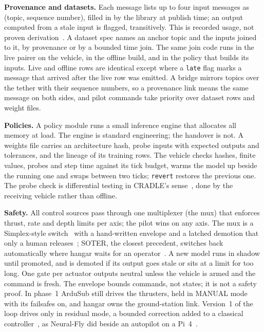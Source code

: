 \documentclass[conference]{IEEEtran}
\begin{document}
\textbf{Provenance and datasets.} Each message lists up to four input
messages as (topic, sequence number), filled in by the library at publish
time; an output computed from a stale input is flagged, transitively. This is
recorded usage, not proven derivation~\cite{provdm2013}. A dataset spec names
an anchor topic and the inputs joined to it, by provenance or by a bounded
time join. The same join code runs in the live pairer on the vehicle, in the
offline build, and in the policy that builds its inputs. Live and offline
rows are identical except where a \texttt{late} flag marks a message that
arrived after the live row was emitted. A bridge mirrors topics over the
tether with their sequence numbers, so a provenance link means the same
message on both sides, and pilot commands take priority over dataset rows and
weight files.

\textbf{Policies.} A policy module runs a small inference engine that
allocates all memory at load. The engine is standard engineering; the
handover is not. A weights file carries an architecture hash, probe inputs
with expected outputs and tolerances, and the lineage of its training rows.
The vehicle checks hashes, finite values, probes and step time against its
tick budget, warms the model up beside the running one and swaps between two
ticks; \texttt{revert} restores the previous one. The probe check is
differential testing in CRADLE's sense~\cite{pham2019cradle}, done by the
receiving vehicle rather than offline.

\textbf{Safety.} All control sources pass through one multiplexer (the mux)
that enforces thrust, rate and depth limits per axis; the pilot wins on any
axis. The mux is a Simplex-style switch~\cite{seto1998simplex} with a
hand-written envelope and a latched demotion that only a human
releases~\cite{hobbs2023rta}; SOTER, the closest precedent, switches back
automatically where hangar waits for an operator~\cite{desai2019soter}. A new
model runs in shadow until promoted, and is demoted if its output goes stale
or sits at a limit for too long. One gate per actuator outputs neutral unless
the vehicle is armed and the command is fresh. The envelope bounds commands,
not states; it is not a safety proof. In phase~1 ArduSub still drives the
thrusters, held in MANUAL mode with its failsafes on, and hangar owns the
ground-station link. Version~1 of the loop drives only in residual mode, a
bounded correction added to a classical
controller~\cite{johannink2019residual}, as Neural-Fly did beside an autopilot
on a Pi~4~\cite{oconnell2022neuralfly}.
\end{document}
